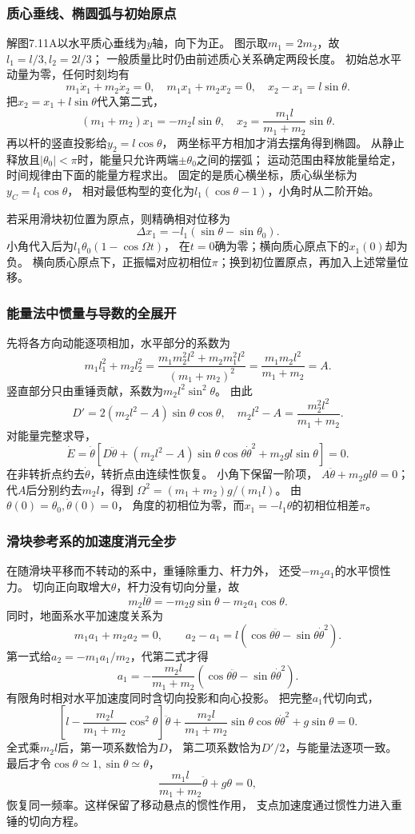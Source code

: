 \documentclass[UTF8,fontset=fandol,a4paper,11pt]{ctexart}
\begin{document}
\subsubsection*{质心垂线、椭圆弧与初始原点}
解图7.11A以水平质心垂线为$y$轴，向下为正。
图示取$m_1=2m_2$，故$l_1=l/3,l_2=2l/3$；
一般质量比时仍由前述质心关系确定两段长度。
初始总水平动量为零，任何时刻均有
\[
m_1\dot x_1+m_2\dot x_2=0,\quad
m_1x_1+m_2x_2=0,\quad x_2-x_1=l\sin\theta.
\]
把$x_2=x_1+l\sin\theta$代入第二式，
\[
(m_1+m_2)x_1=-m_2l\sin\theta,
\quad x_2=\frac{m_1l}{m_1+m_2}\sin\theta.
\]
再以杆的竖直投影给$y_2=l\cos\theta$，
两坐标平方相加才消去摆角得到椭圆。
从静止释放且$|\theta_0|<\pi$时，能量只允许两端$\pm\theta_0$之间的摆弧；
运动范围由释放能量给定，时间规律由下面的能量方程求出。
固定的是质心横坐标，质心纵坐标为$y_C=l_1\cos\theta$，
相对最低构型的变化为$l_1(\cos\theta-1)$，小角时从二阶开始。

若采用滑块初位置为原点，则精确相对位移为
\[
\Delta x_1=-l_1(\sin\theta-\sin\theta_0).
\]
小角代入后为$l_1\theta_0(1-\cos\Omega t)$，
在$t=0$确为零；横向质心原点下的$x_1(0)$却为负。
横向质心原点下，正振幅对应初相位$\pi$；换到初位置原点，再加入上述常量位移。

\subsubsection*{能量法中惯量与导数的全展开}
先将各方向动能逐项相加，水平部分的系数为
\[
m_1l_1^2+m_2l_2^2
=\frac{m_1m_2^2l^2+m_2m_1^2l^2}{(m_1+m_2)^2}
=\frac{m_1m_2l^2}{m_1+m_2}=A.
\]
竖直部分只由重锤贡献，系数为$m_2l^2\sin^2\theta$。
由此
\[
D'=2(m_2l^2-A)\sin\theta\cos\theta,
\quad m_2l^2-A=\frac{m_2^2l^2}{m_1+m_2}.
\]
对能量完整求导，
\[
\dot E=\dot\theta\left[D\ddot\theta+
(m_2l^2-A)\sin\theta\cos\theta\dot\theta^2
+m_2gl\sin\theta\right]=0.
\]
在非转折点约去$\dot\theta$，转折点由连续性恢复。
小角下保留一阶项，
$A\ddot\theta+m_2gl\theta=0$；
代$A$后分别约去$m_2l$，得到
$\Omega^2=(m_1+m_2)g/(m_1l)$。
由$\theta(0)=\theta_0,\dot\theta(0)=0$，
角度的初相位为零，而$x_1=-l_1\theta$的初相位相差$\pi$。

\subsubsection*{滑块参考系的加速度消元全步}
在随滑块平移而不转动的系中，重锤除重力、杆力外，
还受$-m_2a_1$的水平惯性力。
切向正向取增大$\theta$，杆力没有切向分量，故
\[
m_2l\ddot\theta=-m_2g\sin\theta-m_2a_1\cos\theta.
\]
同时，地面系水平加速度关系为
\[
m_1a_1+m_2a_2=0,\qquad
a_2-a_1=l(\cos\theta\ddot\theta-\sin\theta\dot\theta^2).
\]
第一式给$a_2=-m_1a_1/m_2$，代第二式才得
\[
a_1=-\frac{m_2l}{m_1+m_2}
(\cos\theta\ddot\theta-\sin\theta\dot\theta^2).
\]
有限角时相对水平加速度同时含切向投影和向心投影。
把完整$a_1$代切向式，
\[
\left[l-\frac{m_2l}{m_1+m_2}\cos^2\theta\right]\ddot\theta
+\frac{m_2l}{m_1+m_2}\sin\theta\cos\theta\dot\theta^2
+g\sin\theta=0.
\]
全式乘$m_2l$后，第一项系数恰为$D$，
第二项系数恰为$D'/2$，与能量法逐项一致。
最后才令$\cos\theta\simeq1,\sin\theta\simeq\theta$，
\[
\frac{m_1l}{m_1+m_2}\ddot\theta+g\theta=0,
\]
恢复同一频率。这样保留了移动悬点的惯性作用，
支点加速度通过惯性力进入重锤的切向方程。
\end{document}
